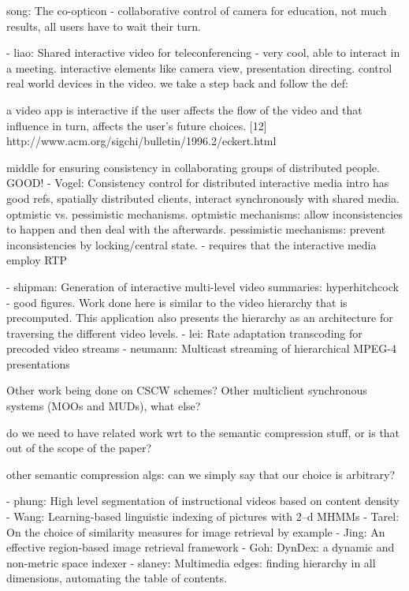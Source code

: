 \documentclass{sig-alternate}
\begin{document}
song: The co-opticon
- collaborative control of camera for education, not much results, 
all users have to wait their turn.

- liao: Shared interactive video for teleconferencing
- very cool, able to interact in a meeting.  interactive elements
like camera view, presentation directing.  control real world devices
in the video.  we take a step back and follow the def: 

a video app is interactive if the user affects the flow of the video
and that influence in turn, affects the user's future choices.  [12]
http://www.acm.org/sigchi/bulletin/1996.2/eckert.html

middle for ensuring consistency in collaborating groups of distributed
people. 
GOOD! - Vogel: Consistency control for distributed interactive
media intro has good refs, spatially distributed clients, interact
synchronously with shared media.  optmistic vs. pessimistic mechanisms.
optmistic mechanisms: allow inconsistencies to happen and then 
deal with the afterwards.
pessimistic mechanisms: prevent inconsistencies by locking/central state.
- requires that the interactive media employ RTP


- shipman: Generation of interactive multi-level video summaries: hyperhitchcock
- good figures.  Work done here is similar to the video hierarchy
that is precomputed.  This application also presents the hierarchy
as an architecture for traversing the different video levels.
- lei: Rate adaptation transcoding for precoded video streams
- neumann: Multicast streaming of hierarchical MPEG-4 presentations

Other work being done on CSCW schemes?  Other multiclient synchronous
systems (MOOs and MUDs), what else?

do we need to have related work wrt to the semantic compression stuff, or
is that out of the scope of the paper?

other semantic compression algs: can we simply say that our choice is arbitrary?

- phung: High level segmentation of instructional videos based on content density 
- Wang: Learning-based linguistic indexing of pictures with 2--d MHMMs
- Tarel: On the choice of similarity measures for image retrieval by example
- Jing: An effective region-based image retrieval framework
- Goh: DynDex: a dynamic and non-metric space indexer
- slaney: Multimedia edges: finding hierarchy in all dimensions,
automating the table of contents.
\end{document}
